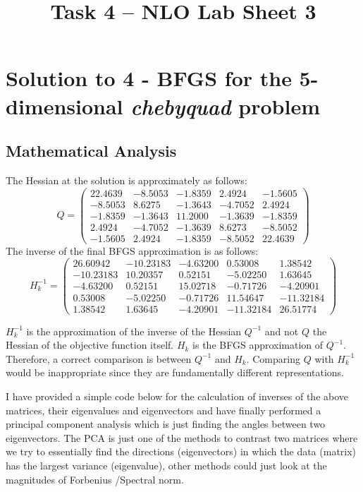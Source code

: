 \documentclass{article}
\begin{document}
\title{Task 4 -- NLO Lab Sheet 3}

\maketitle

\section{Solution to 4 - BFGS for the 5-dimensional \textit{chebyquad} problem}

\subsection{Mathematical Analysis}
The Hessian at the solution is approximately as follows:
$$
Q=\left(\begin{array}{ccccc}
22.4639 & -8.5053 & -1.8359 & 2.4924 & -1.5605 \\
-8.5053 & 8.6275 & -1.3643 & -4.7052 & 2.4924 \\
-1.8359 & -1.3643 & 11.2000 & -1.3639 & -1.8359 \\
2.4924 & -4.7052 & -1.3639 & 8.6273 & -8.5052 \\
-1.5605 & 2.4924 & -1.8359 & -8.5052 & 22.4639
\end{array}\right)
$$
The inverse of the final BFGS approximation is as follows:
$$
H_k^{-1}=\left(\begin{array}{ccccc}
26.60942 & -10.23183 & -4.63200 & 0.53008 & 1.38542 \\
-10.23183 & 10.20357 & 0.52151 & -5.02250 & 1.63645 \\
-4.63200 & 0.52151 & 15.02718 & -0.71726 & -4.20901 \\
0.53008 & -5.02250 & -0.71726 & 11.54647 & -11.32184 \\
1.38542 & 1.63645 & -4.20901 & -11.32184 & 26.51774
\end{array}\right)
$$





$H_k^{-1}$ is the approximation of the inverse of the Hessian $Q^{-1}$ and not $Q$ the Hessian of the objective function itself. $H_k$ is the BFGS approximation of $Q^{-1}$. Therefore, a correct comparison is between $Q^{-1}$ and $H_k$. Comparing $Q$ with $H_k^{-1}$ would be inappropriate since they are fundamentally different representations. 

I have provided a simple code below for the calculation of inverses of the above matrices, their eigenvalues and eigenvectors and have finally performed a principal component analysis which is just finding the angles between two eigenvectors. The PCA is just one of the methods to contrast two matrices where we try to essentially find the directions (eigenvectors) in which the data (matrix) has the largest variance (eigenvalue), other methods could just look at the magnitudes of Forbenius /Spectral norm. 
\end{document}
